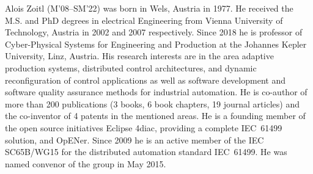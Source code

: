 \documentclass{ieeeojies}
\begin{document}
\begin{IEEEbiography}{Alois Zoitl} (M'08--SM'22) was born in Wels, Austria in 1977. He received the M.S. and PhD degrees in electrical Engineering from Vienna University of Technology, Austria in 2002 and 2007 respectively. 
Since 2018 he is professor of Cyber-Physical Systems for Engineering and Production at the Johannes Kepler University, Linz, Austria.
His research interests are in the area adaptive production systems, distributed control architectures, and dynamic reconfiguration of control applications as well as software development and software quality assurance methods for industrial automation.
He is co-author of more than 200 publications (3 books, 6 book chapters, 19 journal articles) and the co-inventor of 4 patents in the mentioned areas. 
He is a founding member of the open source initiatives Eclipse 4diac, providing a complete IEC~61499 solution, and OpENer. 
Since 2009 he is an active member of the IEC SC65B/WG15 for the distributed automation standard IEC~61499. He was named convenor of the group in May 2015.
\end{IEEEbiography}
\end{document}
